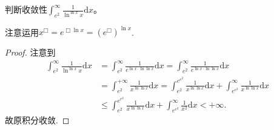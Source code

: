 \documentclass[../../main.tex]{subfiles}
\begin{document}
\begin{example}
判断收敛性\(\int_{e^2}^{\infty}\frac{1}{\ln^{\ln x}x}\mathrm{d}x\)。 
\end{example}
\begin{note}
注意运用\(x^{\Box}=e^{\Box\ln x}=(e^{\Box})^{\ln x}\).
\end{note}
\begin{proof}
注意到
\begin{align*}
\int_{e^2}^{\infty}\frac{1}{\ln^{\ln x}x}\mathrm{d}x&=\int_{e^2}^{\infty}\frac{1}{e^{\ln x\cdot \ln\ln x}}\mathrm{d}x=\int_{e^2}^{\infty}\frac{1}{e^{\ln x\cdot \ln\ln x}}\mathrm{d}x\\
&=\int_{e^2}^{+\infty}\frac{1}{x^{\ln\ln x}}\mathrm{d}x=\int_{e^2}^{e^{e^2}}\frac{1}{x^{\ln\ln x}}\mathrm{d}x+\int_{e^{e^2}}^{\infty}\frac{1}{x^{\ln\ln x}}\mathrm{d}x\\
&\leqslant \int_{e^2}^{e^{e^2}}\frac{1}{x^{\ln\ln x}}\mathrm{d}x+\int_{e^{e^2}}^{\infty}\frac{1}{x^2}\mathrm{d}x<+\infty.
\end{align*}
故原积分收敛. 

\end{proof}
\end{document}
